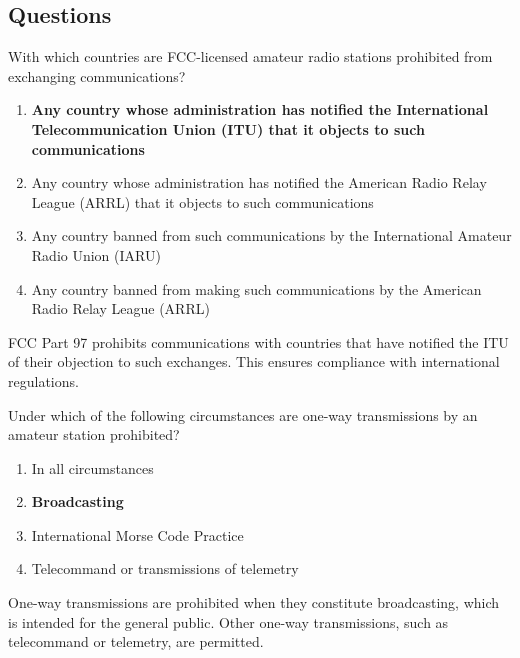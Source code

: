 \subsection*{Questions}
\begin{tcolorbox}[colback=gray!10!white,colframe=black!75!black,title={T1D01}]
    With which countries are FCC-licensed amateur radio stations prohibited from exchanging communications?
    \begin{enumerate}[label=\Alph*),noitemsep]
        \item \textbf{Any country whose administration has notified the International Telecommunication Union (ITU) that it objects to such communications}
        \item Any country whose administration has notified the American Radio Relay League (ARRL) that it objects to such communications
        \item Any country banned from such communications by the International Amateur Radio Union (IARU)
        \item Any country banned from making such communications by the American Radio Relay League (ARRL)
    \end{enumerate}
\end{tcolorbox}
FCC Part 97 prohibits communications with countries that have notified the ITU of their objection to such exchanges. This ensures compliance with international regulations.


\begin{tcolorbox}[colback=gray!10!white,colframe=black!75!black,title={T1D02}]
    Under which of the following circumstances are one-way transmissions by an amateur station prohibited?
    \begin{enumerate}[label=\Alph*),noitemsep]
        \item In all circumstances
        \item \textbf{Broadcasting}
        \item International Morse Code Practice
        \item Telecommand or transmissions of telemetry
    \end{enumerate}
\end{tcolorbox}
One-way transmissions are prohibited when they constitute broadcasting, which is intended for the general public. Other one-way transmissions, such as telecommand or telemetry, are permitted.


